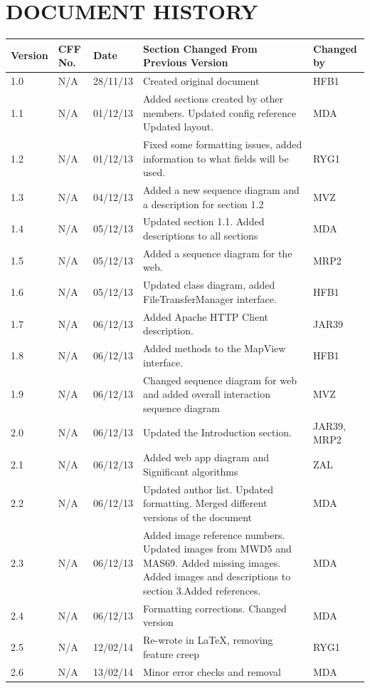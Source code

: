 \documentclass[12pt]{article}
\begin{document}
\section{DOCUMENT HISTORY}
\setlength\LTleft{-0.5cm}
\begin{longtable}{|p{1.3cm}|p{1.5cm}|p{2cm}|p{7cm}| p{2cm}|}
\hline
	Version & CFF No. & Date & Section Changed From Previous Version & Changed by \\
\hline
	1.0 & N/A & 28/11/13 & Created original document & HFB1 \\ 
\hline
	1.1 & N/A & 01/12/13 & Added sections created by other members. 
Updated config reference 
Updated layout. & MDA
 \\
\hline
	1.2 & N/A & 01/12/13 & Fixed some formatting issues, added information to what fields will be used. & RYG1 \\
\hline 
	1.3 & N/A & 04/12/13 & Added a new sequence diagram and a description for section 1.2 & MVZ
\\
\hline 
	1.4 & N/A & 05/12/13 & Updated section 1.1. Added descriptions to all sections & MDA \\
\hline 
	1.5 & N/A & 05/12/13 & Added a sequence diagram for the web.
 & MRP2 \\
\hline
	1.6 & N/A & 05/12/13 & Updated class diagram, added FileTransferManager interface. & HFB1 \\
\hline 
	1.7 & N/A & 06/12/13 & Added Apache HTTP Client description. & JAR39 \\
\hline 
	1.8 & N/A & 06/12/13 & Added methods to the MapView interface. & HFB1
 \\
\hline	
	1.9 &N/A&06/12/13&Changed sequence diagram for web and added
overall interaction sequence diagram & MVZ\\
\hline 
	2.0&N/A&06/12/13&Updated the Introduction section.&JAR39,
MRP2 \\
\hline
	2.1&N/A&06/12/13&Added web app diagram and Significant algorithms &ZAL \\
\hline 
	2.2&N/A&06/12/13&Updated author list. Updated formatting. Merged different versions of the document&MDA\\
\hline
	2.3&N/A&06/12/13& Added image reference numbers. Updated images 
from MWD5 and MAS69. Added missing images. Added images and descriptions to section 3.Added references. & MDA\\
\hline 
	2.4&N/A&06/12/13&Formatting corrections. Changed version&MDA \\
\hline 
	2.5&N/A&12/02/14&Re-wrote in LaTeX, removing feature creep &RYG1 \\
\hline
	2.6&N/A&13/02/14&Minor error checks and removal &MDA \\
 \hline
\end{longtable}
\end{document}
